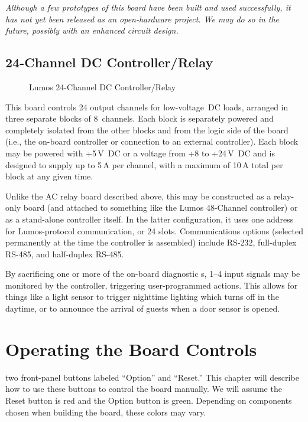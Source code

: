 \documentclass[letterpaper,twoside,onecolumn,openright,final]{memoir}
\begin{document}
\emph{Although a few prototypes of this board have been built and used successfully, it has not yet been
released as an open-hardware project.  We may do so in the future, possibly with an enhanced circuit
design.}
\section{24-Channel DC Controller/Relay}
\begin{figure}
  \begin{center}
  \end{center}
  \caption{Lumos 24-Channel DC Controller/Relay}
\end{figure}
This board controls 24 output channels for low-voltage~DC loads, arranged in three separate blocks 
of 8~channels.  Each block is separately powered and completely isolated from the other blocks and 
from the logic side of the board (i.e., the on-board controller or connection to an external
controller).  Each block may be powered with +5\,V~DC or a voltage from +8 to +24\,V~DC and
is designed to supply up to 5\,A per channel, with a maximum of 10\,A total per block at any 
given time.

Unlike the AC relay board described above, this may be constructed as a relay-only board (and attached
to something like the Lumos 48-Channel controller) or as a stand-alone controller itself.  In the latter
configuration, it uses one address for Lumos-protocol communication, or 24  slots.
Communications options (selected permanently at the time the controller is assembled) include
RS-232, full-duplex RS-485, and half-duplex RS-485.

By sacrificing one or more of the on-board diagnostic s, 1--4 input signals may be 
monitored by the controller, triggering user-programmed actions.  This allows for things like
a light sensor to trigger nighttime lighting which turns off in the daytime, or to announce the
arrival of guests when a door sensor is opened.


\chapter{Operating the Board Controls}
 two front-panel buttons labeled ``Option'' and ``Reset.''
This chapter will describe how to use these buttons to control the board manually.  We will assume the
Reset button is red and the Option button is green.  Depending on components chosen when building the
board, these colors may vary.
\end{document}
